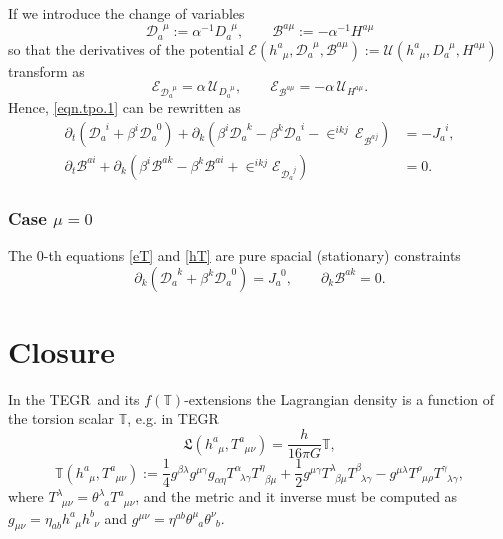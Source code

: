 \documentclass[
10pt, %
a4paper, %
oneside, %
headinclude,footinclude, %
BCOR5mm, %
]{scrartcl}
\newcommand{\pd}[1]{\partial_{#1}}
\newcommand{\tetrsymbol}{h}
\newcommand{\itetrsymbol}{\theta}
\newcommand{\itetr}[2]{\itetrsymbol^{#1}_{\phantom{#1}#2}}
\newcommand{\tetr}[2]{\tetrsymbol^{#1}_{\phantom{#1}#2}}
\newcommand{\detTetr}{\tetrsymbol}
\newcommand{\Tors}[2]{T^{#1}_{\phantom{a}#2}}
\newcommand{\eT}[2]{D_{#1}^{\phantom{#1}#2}}	%
\newcommand{\dT}[2]{\mathcal{D}_{#1}^{\phantom{#1}#2}}	%
\newcommand{\hT}[2]{H^{#1#2}}	%
\newcommand{\bT}[2]{\mathcal{B}^{#1#2}}	%
\newcommand{\Lagtors}{\mathfrak{L}}%
\newcommand{\LagST}{\mathcal{U}}%
\newcommand{\Lagtpo}{\mathcal{E}}%
\newcommand{\LCsymb}{\bm{\in}}    %
\newcommand{\tegr}{TEGR}
\newcommand{\NC}[2]{J^{\phantom{#1}#2}_{#1}}
\newcommand{\lapse}{\alpha}
\newcommand{\shift}[1]{\beta^{#1}}
\newcommand{\Tscal}{\mathbb{T}}		%
\begin{document}
If we introduce the change of variables
\begin{equation}
	\dT{a}{\mu} := \lapse^{-1} \eT{a}{\mu}, \qquad \bT{a}{\mu} := -\lapse^{-1}\hT{a}{\mu}
\end{equation}
so that the derivatives of the potential $ \Lagtpo(\tetr{a}{\mu},\dT{a}{\mu},\bT{a}{\mu}) := 
\LagST(\tetr{a}{\mu},\eT{a}{\mu},\hT{a}{\mu})
$ 
transform as
\begin{equation}
	\Lagtpo_{\dT{a}{\mu}} =  \lapse \, \LagST_{\eT{a}{\mu}},
	\qquad
	\Lagtpo_{\bT{a}{\mu}} = -\lapse \, \LagST_{\hT{a}{\mu}}.
\end{equation}
Hence, \eqref{eqn.tpo.1} can be rewritten as
\begin{subequations}\label{eqn.tpo.2}
	\begin{align}
	\pd{t} (\dT{a}{i} + \shift{i} \dT{a}{0}) + \pd{k}(\shift{i} 
	\dT{a}{k} - \shift{k}\dT{a}{i}  - \LCsymb^{ikj} \,
	\Lagtpo_{\bT{a}{j}}) & 
	= -\NC{a}{i}, \\[2mm]
	\pd{t} \bT{a}{i} + \pd{k}(\shift{i} 
	\bT{a}{k} - \shift{k}\bT{a}{i}  + \LCsymb^{ikj} 
	\Lagtpo_{\dT{a}{j}}) & 
	= 0 .
	\end{align}
\end{subequations}



\subsubsection{Case $ \mu = 0 $} 

The $ 0 $-th equations \eqref{eT} and \eqref{hT} are pure spacial (stationary) constraints
\begin{equation}
	\pd{k} (\dT{a}{k} + \shift{k}\dT{a}{0}) = \NC{a}{0}, 
	\qquad
	\pd{k} \bT{a}{k} = 0.
\end{equation}





\section{Closure}



In the \tegr\ and its $ f(\Tscal) $-extensions the Lagrangian density is a function of the 
torsion scalar $ \Tscal $, e.g. in \tegr\ 
\begin{equation}
	\Lagtors(\tetr{a}{\mu},\Tors{a}{\mu\nu}) = \frac{\detTetr}{16\pi G} \Tscal,
\end{equation}
\begin{equation}
	\Tscal(\tetr{a}{\mu},\Tors{a}{\mu\nu}) := \frac14 g^{\beta\lambda} g^{\mu\gamma} g_{\alpha\eta} 
	\Tors{\alpha}{\lambda\gamma}
	\Tors{\eta}{\beta\mu} +
			  \frac12 g^{\mu\gamma} \Tors{\lambda}{\beta\mu} \Tors{\beta}{\lambda\gamma} - 
			  g^{\mu\lambda} \Tors{\rho}{\mu\rho} \Tors{\gamma}{\lambda\gamma},	  
\end{equation}
where $ \Tors{\lambda}{\mu\nu} = \itetr{\lambda}{a} \Tors{a}{\mu\nu} $, and the metric and it 
inverse must be computed as $ g_{\mu\nu} = 
\eta_{ab}\tetr{a}{\mu}\tetr{b}{\nu} $ and $ g^{\mu\nu} = \eta^{ab}\itetr{\mu}{a}\itetr{\nu}{b}$.
\end{document}
